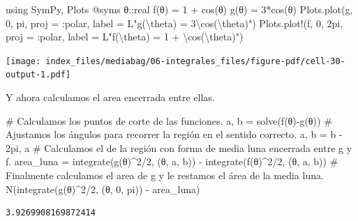 \documentclass[
  a4paper,
]{scrreport}
\newenvironment{Shaded}{\begin{snugshade}}{\end{snugshade}}
\newcommand{\BuiltInTok}[1]{\textcolor[rgb]{0.00,0.23,0.31}{#1}}
\newcommand{\CommentTok}[1]{\textcolor[rgb]{0.37,0.37,0.37}{#1}}
\newcommand{\ConstantTok}[1]{\textcolor[rgb]{0.56,0.35,0.01}{#1}}
\newcommand{\DataTypeTok}[1]{\textcolor[rgb]{0.68,0.00,0.00}{#1}}
\newcommand{\FloatTok}[1]{\textcolor[rgb]{0.68,0.00,0.00}{#1}}
\newcommand{\FunctionTok}[1]{\textcolor[rgb]{0.28,0.35,0.67}{#1}}
\newcommand{\ImportTok}[1]{\textcolor[rgb]{0.00,0.46,0.62}{#1}}
\newcommand{\NormalTok}[1]{\textcolor[rgb]{0.00,0.23,0.31}{#1}}
\newcommand{\OperatorTok}[1]{\textcolor[rgb]{0.37,0.37,0.37}{#1}}
\newcommand{\PreprocessorTok}[1]{\textcolor[rgb]{0.68,0.00,0.00}{#1}}
\newcommand{\SpecialCharTok}[1]{\textcolor[rgb]{0.37,0.37,0.37}{#1}}
\newcommand{\StringTok}[1]{\textcolor[rgb]{0.13,0.47,0.30}{#1}}
\theoremstyle{definition}
\theoremstyle{remark}
\begin{document}
\begin{tcolorbox}
\begin{Shaded}
\begin{Highlighting}[]
\ImportTok{using} \BuiltInTok{SymPy}\NormalTok{, }\BuiltInTok{Plots}
\PreprocessorTok{@syms}\NormalTok{ θ}\OperatorTok{::}\DataTypeTok{real}
\FunctionTok{f}\NormalTok{(θ) }\OperatorTok{=} \FloatTok{1} \OperatorTok{+} \FunctionTok{cos}\NormalTok{(θ)}
\FunctionTok{g}\NormalTok{(θ) }\OperatorTok{=} \FloatTok{3}\FunctionTok{*cos}\NormalTok{(θ)}
\NormalTok{Plots.}\FunctionTok{plot}\NormalTok{(g, }\FloatTok{0}\NormalTok{, }\ConstantTok{pi}\NormalTok{, proj }\OperatorTok{=} \OperatorTok{:}\NormalTok{polar, label }\OperatorTok{=}\NormalTok{ L}\StringTok{"g(}\SpecialCharTok{\textbackslash{}t}\StringTok{heta) = 3\textbackslash{}cos(}\SpecialCharTok{\textbackslash{}t}\StringTok{heta)"}\NormalTok{)}
\NormalTok{Plots.}\FunctionTok{plot!}\NormalTok{(f, }\FloatTok{0}\NormalTok{, }\FloatTok{2}\NormalTok{pi, proj }\OperatorTok{=} \OperatorTok{:}\NormalTok{polar, label }\OperatorTok{=}\NormalTok{ L}\StringTok{"f(}\SpecialCharTok{\textbackslash{}t}\StringTok{heta) = 1 + \textbackslash{}cos(}\SpecialCharTok{\textbackslash{}t}\StringTok{heta)"}\NormalTok{)}
\end{Highlighting}
\end{Shaded}

\texttt{[image: index\_files/mediabag/06-integrales\_files/figure-pdf/cell-30-output-1.pdf]}

Y ahora calculamos el area encerrada entre ellas.

\begin{Shaded}
\begin{Highlighting}[]
\CommentTok{\# Calculamos los puntos de corte de las funciones.}
\NormalTok{a, b }\OperatorTok{=} \FunctionTok{solve}\NormalTok{(}\FunctionTok{f}\NormalTok{(θ)}\FunctionTok{{-}g}\NormalTok{(θ))}
\CommentTok{\# Ajustamos los ángulos para recorrer la región en el sentido correcto.}
\NormalTok{a, b }\OperatorTok{=}\NormalTok{ b }\OperatorTok{{-}} \FloatTok{2}\NormalTok{pi, a  }
\CommentTok{\# Calculamos el de la región con forma de media luna encerrada entre g y f.}
\NormalTok{area\_luna }\OperatorTok{=} \FunctionTok{integrate}\NormalTok{(}\FunctionTok{g}\NormalTok{(θ)}\OperatorTok{\^{}}\FloatTok{2}\OperatorTok{/}\FloatTok{2}\NormalTok{, (θ, a, b)) }\OperatorTok{{-}} \FunctionTok{integrate}\NormalTok{(}\FunctionTok{f}\NormalTok{(θ)}\OperatorTok{\^{}}\FloatTok{2}\OperatorTok{/}\FloatTok{2}\NormalTok{, (θ, a, b))}
\CommentTok{\# Finalmente calculamos el area de g y le restamos el área de la media luna.}
\FunctionTok{N}\NormalTok{(}\FunctionTok{integrate}\NormalTok{(}\FunctionTok{g}\NormalTok{(θ)}\OperatorTok{\^{}}\FloatTok{2}\OperatorTok{/}\FloatTok{2}\NormalTok{, (θ, }\FloatTok{0}\NormalTok{, }\ConstantTok{pi}\NormalTok{)) }\OperatorTok{{-}}\NormalTok{ area\_luna)}
\end{Highlighting}
\end{Shaded}

\begin{verbatim}
3.9269908169872414
\end{verbatim}

\end{tcolorbox}
\end{document}
